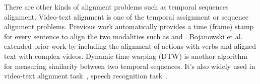 There are other kinds of alignment problems such as temporal sequences alignment. Video-text alignment is one of the temporal assignment or sequence alignment problems. Previous work automatically provides a time (frame) stamp for every sentence to align the two modalities such as \cite{bojanowski2015weakly} and \cite{dogan2018neural}. Bojanowski et al.~\cite{bojanowski2015weakly} extended prior work by including the alignment of actions with verbs and aligned text with complex videos. Dynamic time warping (DTW) is anothor algorithm for measuring similarity between two temporal sequences. It's also widely used in video-text alignment task~\cite{dogan2018neural}, 
speech recognition task~\cite{vintsyuk1968speech}.%





